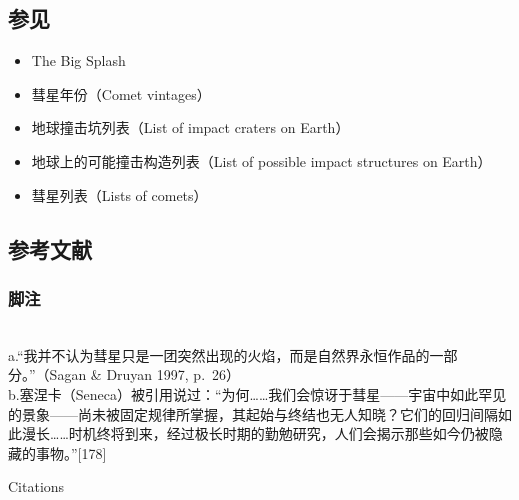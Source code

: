 \subsection{参见}
\begin{itemize}
\item The Big Splash  
\item 彗星年份（Comet vintages）  
\item 地球撞击坑列表（List of impact craters on Earth）  
\item 地球上的可能撞击构造列表（List of possible impact structures on Earth）  
\item 彗星列表（Lists of comets） 
\end{itemize} 
\subsection{参考文献}
\subsubsection{脚注}\\
a.“我并不认为彗星只是一团突然出现的火焰，而是自然界永恒作品的一部分。”（Sagan \& Druyan 1997, p.~26）\\
b.塞涅卡（Seneca）被引用说过：“为何……我们会惊讶于彗星——宇宙中如此罕见的景象——尚未被固定规律所掌握，其起始与终结也无人知晓？它们的回归间隔如此漫长……时机终将到来，经过极长时期的勤勉研究，人们会揭示那些如今仍被隐藏的事物。”[178]

Citations

